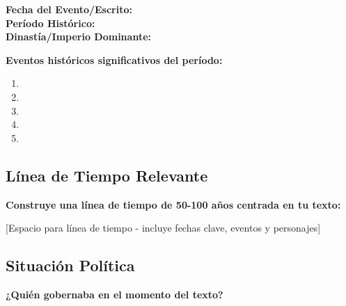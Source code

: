 \documentclass[11pt,a4paper]{article}
\begin{document}
\begin{historytimeline}
\textbf{Fecha del Evento/Escrito:} \hspace{8cm}\\[0.5cm]
\textbf{Período Histórico:} \hspace{8cm}\\[0.5cm]
\textbf{Dinastía/Imperio Dominante:} \hspace{8cm}
\end{historytimeline}

\textbf{Eventos históricos significativos del período:}
\begin{enumerate}[leftmargin=1cm]
    \item \hspace{12cm}
    \vspace{0.3cm}
    \item \hspace{12cm}
    \vspace{0.3cm}
    \item \hspace{12cm}
    \vspace{0.3cm}
    \item \hspace{12cm}
    \vspace{0.3cm}
    \item \hspace{12cm}
\end{enumerate}

\subsection{Línea de Tiempo Relevante}

\begin{historybox}
\textbf{Construye una línea de tiempo de 50-100 años centrada en tu texto:}
\end{historybox}

\vspace{4cm}
\begin{center}
[Espacio para línea de tiempo - incluye fechas clave, eventos y personajes]
\end{center}
\vspace{2cm}

\subsection{Situación Política}

\textbf{¿Quién gobernaba en el momento del texto?}
\vspace{2cm}
\end{document}
